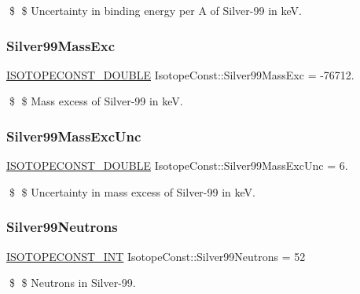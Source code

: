 \$ \$ Uncertainty in binding energy per A of Silver-\/99 in keV. \mbox{\label{group___isotope_const-_silver-_ag99_ga25b978eabc6729f42bc662c9abb966e1}} 
\subsubsection{\texorpdfstring{Silver99\+Mass\+Exc}{Silver99MassExc}}
{\footnotesize\ttfamily \mbox{\hyperlink{group___isotope_const-_macros_ga8f45a7272ce02c0b4c65c44636ed719a}{I\+S\+O\+T\+O\+P\+E\+C\+O\+N\+S\+T\+\_\+\+D\+O\+U\+B\+LE}} Isotope\+Const\+::\+Silver99\+Mass\+Exc = -\/76712.}

\$ \$ Mass excess of Silver-\/99 in keV. \mbox{\label{group___isotope_const-_silver-_ag99_ga8f7823d5d70cf23c9dac03138f44d602}} 
\subsubsection{\texorpdfstring{Silver99\+Mass\+Exc\+Unc}{Silver99MassExcUnc}}
{\footnotesize\ttfamily \mbox{\hyperlink{group___isotope_const-_macros_ga8f45a7272ce02c0b4c65c44636ed719a}{I\+S\+O\+T\+O\+P\+E\+C\+O\+N\+S\+T\+\_\+\+D\+O\+U\+B\+LE}} Isotope\+Const\+::\+Silver99\+Mass\+Exc\+Unc = 6.}

\$ \$ Uncertainty in mass excess of Silver-\/99 in keV. \mbox{\label{group___isotope_const-_silver-_ag99_ga1f37562e0317aacb32773269c7a86977}} 
\subsubsection{\texorpdfstring{Silver99\+Neutrons}{Silver99Neutrons}}
{\footnotesize\ttfamily \mbox{\hyperlink{group___isotope_const-_macros_ga5f18360b3e99483a35c32d789e62621c}{I\+S\+O\+T\+O\+P\+E\+C\+O\+N\+S\+T\+\_\+\+I\+NT}} Isotope\+Const\+::\+Silver99\+Neutrons = 52}

\$ \$ Neutrons in Silver-\/99. \mbox{\label{group___isotope_const-_silver-_ag99_gaff1b8aec6025a54c21419c6d7a81926d}} 
